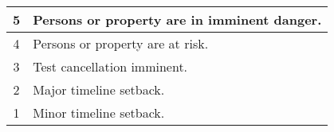 \begin{tabularx}{0.9\textwidth}{|c|X|}
    \hline
    \cellcolor{red} 5 & Persons or property are in imminent danger. \\ \hline
    \cellcolor{orange} 4 & Persons or property are at risk. \\ \hline
    \cellcolor{yellow} 3 & Test cancellation imminent. \\ \hline
    \cellcolor{teal} 2 & Major timeline setback. \\ \hline
    \cellcolor{green} 1 & Minor timeline setback. \\ \hline
\end{tabularx}